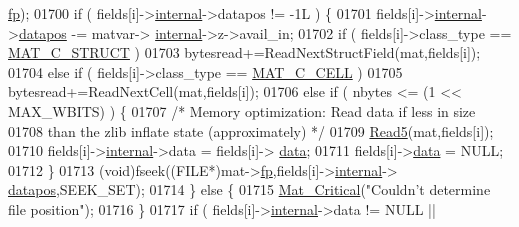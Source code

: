 \begin{DoxyCode}
{{{{{{{{{{{{{{      \hyperlink{struct__mat__t_a85f562e407ca9ad4d2a6e14f839432b7}{fp});
01700                         \textcolor{keywordflow}{if} ( fields[i]->\hyperlink{namespaceinternal}{internal}->datapos != -1L ) \{
01701                             fields[i]->\hyperlink{group___m_a_t_a6e97e3ed9f40c49322c18561c2a94e92}{internal}->\hyperlink{structmatvar__internal_afd3bfaab126a160bd6855563e1ea0a7e}{datapos} -= matvar->
      \hyperlink{group___m_a_t_a6e97e3ed9f40c49322c18561c2a94e92}{internal}->z->avail\_in;
01702                             \textcolor{keywordflow}{if} ( fields[i]->class\_type == \hyperlink{group___m_a_t_ggad4d60ae7b709fc81bfd744fb4c857c40acb467c7749c80902b798134c729bb521}{MAT\_C\_STRUCT} )
01703                                 bytesread+=ReadNextStructField(mat,fields[i]);
01704                             \textcolor{keywordflow}{else} \textcolor{keywordflow}{if} ( fields[i]->class\_type == \hyperlink{group___m_a_t_ggad4d60ae7b709fc81bfd744fb4c857c40a2f7abb47a1c51e248bd4e5e03cc81b08}{MAT\_C\_CELL} )
01705                                 bytesread+=ReadNextCell(mat,fields[i]);
01706                             \textcolor{keywordflow}{else} \textcolor{keywordflow}{if} ( nbytes <= (1 << MAX\_WBITS) ) \{
01707                                 \textcolor{comment}{/* Memory optimization: Read data if less in size}
01708 \textcolor{comment}{                                   than the zlib inflate state (approximately) */}
01709                                 \hyperlink{mat5_8c_abd8669832a02e759fe190bf2724f60ae}{Read5}(mat,fields[i]);
01710                                 fields[i]->\hyperlink{group___m_a_t_a6e97e3ed9f40c49322c18561c2a94e92}{internal}->data = fields[i]->
      \hyperlink{group___m_a_t_a5672978efa230bbdecdf38ede781f7fa}{data};
01711                                 fields[i]->\hyperlink{group___m_a_t_a5672978efa230bbdecdf38ede781f7fa}{data} = NULL;
01712                             \}
01713                             (void)fseek((FILE*)mat->\hyperlink{struct__mat__t_a85f562e407ca9ad4d2a6e14f839432b7}{fp},fields[i]->\hyperlink{group___m_a_t_a6e97e3ed9f40c49322c18561c2a94e92}{internal}->
      \hyperlink{structmatvar__internal_afd3bfaab126a160bd6855563e1ea0a7e}{datapos},SEEK\_SET);
01714                         \} \textcolor{keywordflow}{else} \{
01715                             \hyperlink{group__mat__util_gaf51f2bfbb5580f575e4dd79757e2b80c}{Mat\_Critical}(\textcolor{stringliteral}{"Couldn't determine file position"});
01716                         \}
01717                         \textcolor{keywordflow}{if} ( fields[i]->\hyperlink{namespaceinternal}{internal}->data != NULL ||
}}}}}}}}}}}}}}
\end{DoxyCode}

